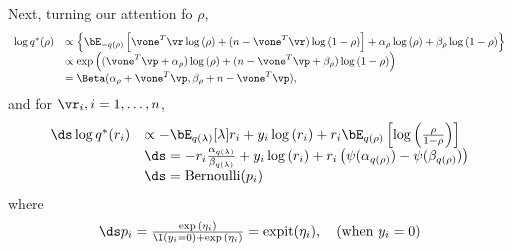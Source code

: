 \noindent Next, turning our attention fo $\rho$,
\[
\begin{array}{rl}
	\log{q^*(\rho)} 
	  &                                                                 
	\propto \left\{ 
	\bE_{-q(\rho)}\left[ 
	\vone^T\vr \log{(\rho)} 
	+ (n - \vone^T\vr) \log{(1 - \rho)} 
	\right] 
	+ \alpha_\rho \log{(\rho)} 
	+ \beta_\rho \log{(1 - \rho)} 
	\right\} 
	\\ [0.5ex]
	  &                                                                 
	\propto \exp \left( 
	(\vone^T\vp + \alpha_\rho) \log{(\rho)} 
	+ (n - \vone^T\vp + \beta_\rho) \log{(1 - \rho)} 
	\right) 
	\\ [0.5ex]
	  & = \Beta(\alpha_\rho + \vone^T\vp, \beta_\rho + n - \vone^T\vp), 
\end{array}
\]
\noindent and for $\vr_i, i=1, \ldots, n$,
\[
\begin{array}{rl}
	\ds \log{q^*(r_i)} & \propto -\bE_{q(\lambda)} [\lambda ] r_i + y_i \log{(r_i)} + r_i \bE_{q(\rho)} \left[\log{\left(\frac{\rho}{1 - \rho}\right)}\right]          \\[0.5ex]
	                   & \ds = -r_i \frac{\alpha_{q(\lambda)}}{\beta_{q(\lambda)}} + y_i \log{(r_i)} + r_i \left(\psi(\alpha_{q(\rho)}) - \psi(\beta_{q(\rho)})\right) \\ [0.5ex]%
	                   & \ds = \text{Bernoulli}(p_i)                                                                                                                   
\end{array}
\]
\noindent where
\[
\begin{array}{rl}
	\ds p_i                                               
	= \frac{\exp{(\eta_i)}}{\I(y_i = 0) + \exp{(\eta_i)}}  
	= \text{expit}(\eta_i), \quad \mbox{(when $y_i = 0$)} 
\end{array}
\]

